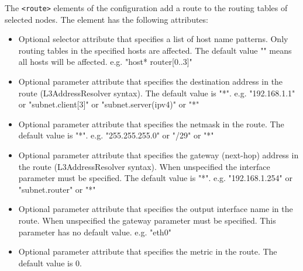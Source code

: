 The \verb!<route>! elements of the configuration add a route to the
routing tables of selected nodes. The element has the following attributes:
\begin{itemize}
    \item {}
      Optional selector attribute that specifies a list of host name patterns.
      Only routing tables in the specified hosts are affected. The default
      value "" means all hosts will be affected.
      e.g. "host* router[0..3]"
    \item {}
      Optional parameter attribute that specifies the destination address in
      the route (L3AddressResolver syntax). The default value is "*".
      e.g. "192.168.1.1" or "subnet.client[3]" or "subnet.server(ipv4)" or "*"
    \item {}
      Optional parameter attribute that specifies the netmask in the route.
      The default value is "*".
      e.g. "255.255.255.0" or "/29" or "*"
    \item {}
      Optional parameter attribute that specifies the gateway (next-hop)
      address in the route (L3AddressResolver syntax). When unspecified
      the interface parameter must be specified. The default value is "*".
      e.g. "192.168.1.254" or "subnet.router" or "*"
    \item {}
      Optional parameter attribute that specifies the output interface name
      in the route. When unspecified the gateway parameter must be specified.
      This parameter has no default value.
      e.g. "eth0"
    \item {}
      Optional parameter attribute that specifies the metric in the route.
      The default value is 0.
\end{itemize}

